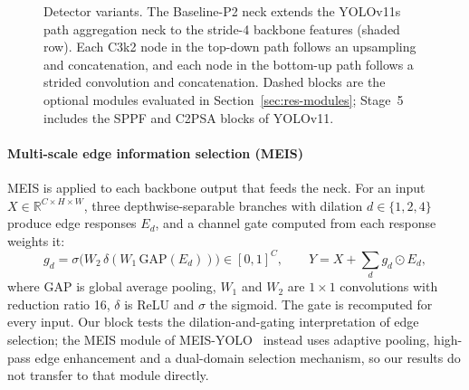 \documentclass[preprint,12pt]{elsarticle}
\begin{document}
\begin{figure}[t]
{%
}
\caption{Detector variants. The Baseline-P2 neck extends the YOLOv11s path
aggregation neck to the stride-4 backbone features (shaded row). Each C3k2 node in
the top-down path follows an upsampling and concatenation, and each node in the
bottom-up path follows a strided convolution and concatenation. Dashed blocks are
the optional modules evaluated in Section~\ref{sec:res-modules}; Stage~5 includes
the SPPF and C2PSA blocks of YOLOv11.}
\label{fig:arch}
\end{figure}

\paragraph{Multi-scale edge information selection (MEIS)}
MEIS is applied to each backbone output that feeds the neck. For an input
$X\in\mathbb{R}^{C\times H\times W}$, three depthwise-separable branches with
dilation $d\in\{1,2,4\}$ produce edge responses $E_d$, and a channel gate computed
from each response weights it:
\begin{equation}
  g_d = \sigma\!\big(W_2\,\delta(W_1\,\mathrm{GAP}(E_d))\big)\in[0,1]^C, \qquad
  Y = X + \sum_{d} g_d \odot E_d ,
  \label{eq:meis}
\end{equation}
where $\mathrm{GAP}$ is global average pooling, $W_1$ and $W_2$ are $1{\times}1$
convolutions with reduction ratio 16, $\delta$ is ReLU and $\sigma$ the sigmoid.
The gate is recomputed for every input. Our block tests the dilation-and-gating
interpretation of edge selection; the MEIS module of MEIS-YOLO~\cite{meis-yolo}
instead uses adaptive pooling, high-pass edge enhancement and a dual-domain
selection mechanism, so our results do not transfer to that module directly.
\end{document}

